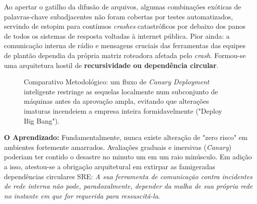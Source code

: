 \documentclass[12pt,a4paper,twoside]{report}
\begin{document}
Ao apertar o gatilho da difusão de arquivos, algumas combinações exóticas de palavras-chave subadjacentes não foram cobertas por testes automatizados, servindo de estopim para contínuos \textit{crashes} catastróficos por debaixo dos panos de todos os sistemas de resposta voltadas à internet pública. 
Pior ainda: a comunicação interna de rádio e mensagens cruciais das ferramentas das equipes de plantão dependia da própria matriz roteadora afetada pelo \textit{crash}. Formou-se uma arquitetura hostil de \textbf{recursividade ou dependência circular}.

\begin{figure}[h]
    \centering
    \caption{Comparativo Metodológico: um fluxo de \textit{Canary Deployment} inteligente restringe as sequelas localmente num subconjunto de máquinas antes da aprovação ampla, evitando que alterações imaturas incendeiem a empresa inteira formidavelmente ("Deploy Big Bang").}
\end{figure}

\textbf{O Aprendizado:} Fundamentalmente, nunca existe alteração de "zero risco" em ambientes fortemente amarrados. Avaliações graduais e imersivas (\textit{Canary}) poderiam ter contido o desastre no minuto um em um raio minúsculo. Em adição a isso, atestou-se a obrigação arquitetural em extirpar as famigeradas dependências circulares SRE: \textit{A sua ferramenta de comunicação contra incidentes de rede interna não pode, paradoxalmente, depender da malha de sua própria rede no instante em que for requerida para ressuscitá-la}.
\end{document}
